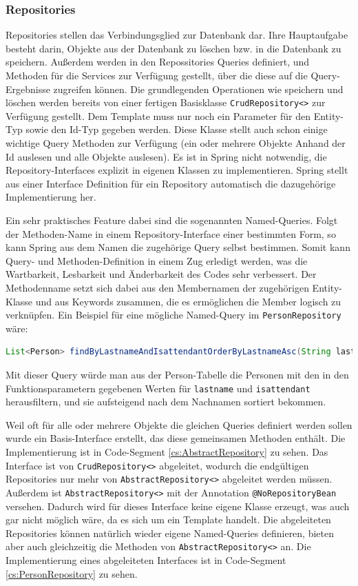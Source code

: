 \subsubsection{Repositories}
\normalsize
Repositories stellen das Verbindungsglied zur Datenbank dar. Ihre Hauptaufgabe besteht darin, Objekte aus der Datenbank zu löschen bzw. in die Datenbank zu speichern. Außerdem werden in den Repossitories Queries definiert, und Methoden für die Services zur Verfügung gestellt, über die diese auf die Query-Ergebnisse zugreifen können. Die grundlegenden Operationen wie speichern und löschen werden bereits von einer fertigen Basisklasse \verb|CrudRepository<>| zur Verfügung gestellt. Dem Template muss nur noch ein Parameter für den Entity-Typ sowie den Id-Typ gegeben werden. Diese Klasse stellt auch schon einige wichtige Query Methoden zur Verfügung (ein oder mehrere Objekte Anhand der Id auslesen und alle Objekte auslesen). Es ist in Spring nicht notwendig, die Repository-Interfaces explizit in eigenen Klassen zu implementieren. Spring stellt aus einer Interface Definition für ein Repository automatisch die dazugehörige Implementierung her. 

Ein sehr praktisches Feature dabei sind die sogenannten Named-Queries. Folgt der Methoden-Name in einem Repository-Interface einer bestimmten Form, so kann Spring aus dem Namen die zugehörige Query selbst bestimmen. Somit kann Query- und Methoden-Definition in einem Zug erledigt werden, was die Wartbarkeit, Lesbarkeit und Änderbarkeit des Codes sehr verbessert. Der Methodenname setzt sich dabei aus den Membernamen der zugehörigen Entity-Klasse und aus Keywords zusammen, die es ermöglichen die Member logisch zu verknüpfen. Ein Beispiel für eine mögliche Named-Query im \verb|PersonRepository| wäre:

\scriptsize
\begin{lstlisting}[language=Java]
	List<Person> findByLastnameAndIsattendantOrderByLastnameAsc(String lastname, Boolean isattendant);
\end{lstlisting}
\normalsize
Mit dieser Query würde man aus der Person-Tabelle die Personen mit den in den Funktionsparametern gegebenen Werten für  \verb|lastname| und  \verb|isattendant| herausfiltern, und sie aufsteigend nach dem Nachnamen sortiert bekommen.

Weil oft für alle oder mehrere Objekte die gleichen Queries definiert werden sollen wurde ein Basis-Interface erstellt, das diese gemeinsamen Methoden enthält. Die Implementierung ist in Code-Segment \ref{cs:AbstractRepository} zu sehen. Das Interface ist von \verb|CrudRepository<>| abgeleitet, wodurch die endgültigen Repositories nur mehr von \verb|AbstractRepository<>| abgeleitet werden müssen. Außerdem ist \verb|AbstractRepository<>| mit der Annotation \verb|@NoRepositoryBean| versehen. Dadurch wird für dieses Interface keine eigene Klasse erzeugt, was auch gar nicht möglich wäre, da es sich um ein Template handelt. Die abgeleiteten Repositories können natürlich wieder eigene Named-Queries definieren, bieten aber auch gleichzeitig die Methoden von \verb|AbstractRepository<>| an. Die Implementierung eines abgeleiteten Interfaces ist in Code-Segment \ref{cs:PersonRepository} zu sehen.

